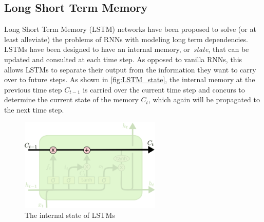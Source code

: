 \subsection{Long Short Term Memory}
Long Short Term Memory (LSTM) networks have been proposed to solve (or at least
alleviate) the problems of RNNs with modeling long term dependencies. LSTMs
have been designed to have an internal memory, or~\emph{state}, that can be
updated and consulted at each time step. As opposed to vanilla RNNs, this
allows LSTMs to separate their output from the information they want to carry
over to future steps. As shown in \autoref{fig:LSTM_state}, the internal memory
at the previous time step $C_{t-1}$ is carried over the current time step and
concurs to determine the current state of the memory $C_t$, which again will be
propagated to the next time step.

\begin{figure}[h]
    \centering
    \includegraphics[width=0.6\textwidth]{pdf/LSTM_state.pdf}
    \caption{The internal state of LSTMs\label{fig:LSTM_state}}
\end{figure}

